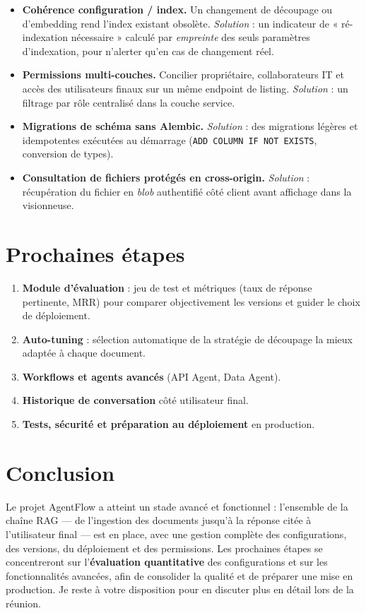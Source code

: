 \documentclass[11pt,a4paper]{article}
\begin{document}
\begin{itemize}
  \item \textbf{Cohérence configuration / index.} Un changement de découpage ou
        d'embedding rend l'index existant obsolète. \emph{Solution} : un
        indicateur de « ré-indexation nécessaire » calculé par \emph{empreinte}
        des seuls paramètres d'indexation, pour n'alerter qu'en cas de
        changement réel.
  \item \textbf{Permissions multi-couches.} Concilier propriétaire,
        collaborateurs IT et accès des utilisateurs finaux sur un même endpoint
        de listing. \emph{Solution} : un filtrage par rôle centralisé dans la
        couche service.
  \item \textbf{Migrations de schéma sans Alembic.} \emph{Solution} : des
        migrations légères et idempotentes exécutées au démarrage
        (\texttt{ADD COLUMN IF NOT EXISTS}, conversion de types).
  \item \textbf{Consultation de fichiers protégés en cross-origin.}
        \emph{Solution} : récupération du fichier en \emph{blob} authentifié côté
        client avant affichage dans la visionneuse.
\end{itemize}

\section{Prochaines étapes}

\begin{enumerate}
  \item \textbf{Module d'évaluation} : jeu de test et métriques (taux de
        réponse pertinente, MRR) pour comparer objectivement les versions et
        guider le choix de déploiement.
  \item \textbf{Auto-tuning} : sélection automatique de la stratégie de découpage
        la mieux adaptée à chaque document.
  \item \textbf{Workflows et agents avancés} (API Agent, Data Agent).
  \item \textbf{Historique de conversation} côté utilisateur final.
  \item \textbf{Tests, sécurité et préparation au déploiement} en production.
\end{enumerate}

\section{Conclusion}

Le projet AgentFlow a atteint un stade avancé et fonctionnel : l'ensemble de la
chaîne RAG — de l'ingestion des documents jusqu'à la réponse citée à
l'utilisateur final — est en place, avec une gestion complète des
configurations, des versions, du déploiement et des permissions. Les prochaines
étapes se concentreront sur l'\textbf{évaluation quantitative} des
configurations et sur les fonctionnalités avancées, afin de consolider la qualité
et de préparer une mise en production. Je reste à votre disposition pour en
discuter plus en détail lors de la réunion.
\end{document}
